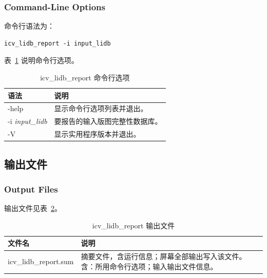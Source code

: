 \subsubsection*{Command-Line Options}

命令行语法为：

\begin{lstlisting}
icv_lidb_report -i input_lidb
\end{lstlisting}

表~\ref{tab:app-c-lidb-report-opts} 说明命令行选项。

\begin{table}[htbp]
\centering
\caption{icv\_lidb\_report 命令行选项}
\label{tab:app-c-lidb-report-opts}
\begin{tabular}{@{}>{\ttfamily\raggedright\arraybackslash}p{} p{}@{}}
\toprule
\textbf{\rmfamily 语法} & \textbf{说明} \\
\midrule
-help & 显示命令行选项列表并退出。 \\
-i \textit{input\_lidb} & 要报告的输入版图完整性数据库。 \\
-V & 显示实用程序版本并退出。 \\
\bottomrule
\end{tabular}
\end{table}

\subsection{输出文件}
\subsubsection*{Output Files}

输出文件见表~\ref{tab:app-c-lidb-report-out}。

\begin{table}[htbp]
\centering
\caption{icv\_lidb\_report 输出文件}
\label{tab:app-c-lidb-report-out}
\begin{tabular}{@{}>{\ttfamily\raggedright\arraybackslash}p{} p{}@{}}
\toprule
\textbf{\rmfamily 文件名} & \textbf{说明} \\
\midrule
icv\_lidb\_report.sum &
摘要文件，含运行信息；屏幕全部输出写入该文件。含：所用命令行选项；输入输出文件信息。 \\
\bottomrule
\end{tabular}
\end{table}
